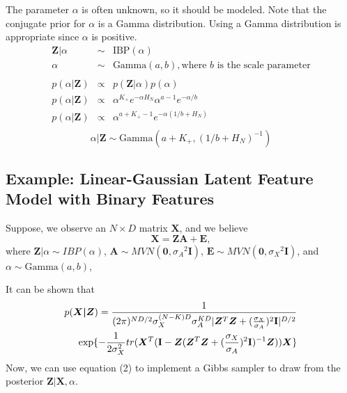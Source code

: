 \noindent
The parameter $\alpha$ is often unknown, so it should be modeled. Note that the
conjugate prior for $\alpha$ is a Gamma distribution. Using a Gamma
distribution is appropriate since $\alpha$ is positive.
\[
  \begin{array}{rcl}
    \bm Z|\alpha & \sim & \text{IBP}(\alpha)\\
          \alpha & \sim & \text{Gamma}(a,b), \text{where $b$ is the scale parameter}\\
    & & \\
    p(\alpha|\bm Z) & \propto & p(\bm Z|\alpha) p(\alpha)\\
    p(\alpha|\bm Z) & \propto & \alpha^{K_+} e^{-\alpha H_N}  
                                \alpha^{a-1} e^{-\alpha/b}\\
    p(\alpha|\bm Z) & \propto & \alpha^{a+K_+-1} e^{-\alpha(1/b+H_N)}\\
  \end{array}
\]
\begin{equation}
  \alpha|\bm Z  \sim  \text{Gamma}(a+K_+, (1/b+H_N)^{-1})
\end{equation}

\subsection{Example: Linear-Gaussian Latent Feature Model with Binary Features}
Suppose, we observe an $N \times D$ matrix $\bm X$, and we believe
\[
  \bm X = \bm{ZA} + \bm E,
\]
where $\bm Z|\alpha \sim IBP(\alpha)$, 
$\bm A \sim MVN(\bm 0,{\sigma_A}^2\textbf{I})$, 
$\bm E \sim MVN(\bm 0,{\sigma_X}^2\textbf{I})$, and
$\alpha \sim \text{Gamma}(a,b)$,

\noindent
It can be shown that
\begin{equation}\begin{split}  
  p(\bm{X|Z}) = \displaystyle\frac{1}{(2\pi)^{ND/2}\sigma_X^{(N-K)D}\sigma_A^{KD}
                            |\bm Z^T \bm Z+({\frac{\sigma_X}{\sigma_A}})^2
                            \textbf{I}|^{D/2}}\\
                \exp\{-\frac{1}{2\sigma_X^2}tr(\bm X^T
                (\textbf{I}-\bm Z(\bm Z^T\bm Z+({\frac{\sigma_X}{\sigma_A}})^2
                            \textbf{I})^{-1}\bm Z))
                \bm X\}            
\end{split}\end{equation}
Now, we can use equation (2) to implement a Gibbs sampler to draw from the 
posterior $\bm{Z|X},\alpha$.

